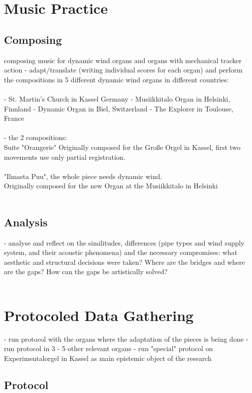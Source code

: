 \section{Music Practice}

\subsection{Composing} 
composing music for dynamic wind organs and organs with mechanical tracker action 
- adapt/translate (writing individual scores for each organ) and perform the compositions in 5 different dynamic wind organs in different countries: \\
\\
- St. Martin's Church in Kassel Germany
- Musiikkitalo Organ in Helsinki, Finnland
- Dynamic Organ in Biel, Switzerland
- The Explorer in Toulouse, France\\
\\
- the 2 compositions: 
\\
Suite "Orangerie" 
Originally composed for the Große Orgel in Kassel, first two movements use only partial registration.\\
\\
"Ilmasta Puu", the whole piece needs dynamic wind.\\
Originally composed for the new Organ at the Musiikkitalo in Helsinki\\
\\
\subsection{Analysis}
- analyse and reflect on the similitudes, differences (pipe types and wind supply system, and their acoustic phenomena) and the necessary compromises: what aesthetic and structural decisions were taken? Where are the bridges and where are the gaps? How can the gaps be artistically solved?\\
\\
\section{Protocoled Data Gathering}

- run protocol with the organs where the adaptation of the pieces is being done
- run protocol in 3 - 5 other relevant organs
- run "special" protocol on Experimentalorgel in Kassel as main epistemic object of the research 

\subsection{Protocol} 

